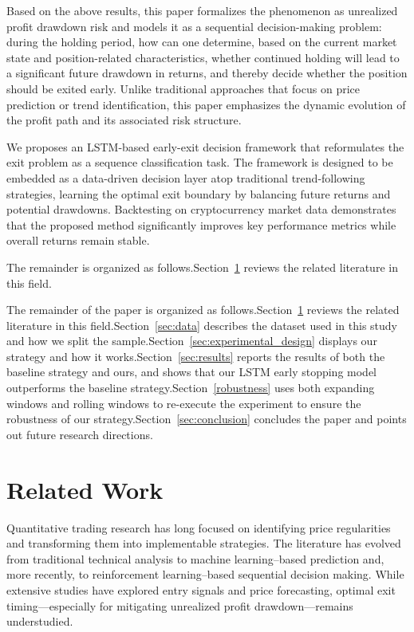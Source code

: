 \documentclass[12pt]{article}
\begin{document}
Based on the above results, this paper formalizes the phenomenon as unrealized profit drawdown risk and models it as a sequential decision-making problem: during the holding period, how can one determine, based on the current market state and position-related characteristics, whether continued holding will lead to a significant future drawdown in returns, and thereby decide whether the position should be exited early. Unlike traditional approaches that focus on price prediction or trend identification, this paper emphasizes the dynamic evolution of the profit path and its associated risk structure.

We proposes an LSTM-based early-exit decision framework that reformulates the exit problem as a sequence classification task. The framework is designed to be embedded as a data-driven decision layer atop traditional trend-following strategies, learning the optimal exit boundary by balancing future returns and potential drawdowns. Backtesting on cryptocurrency market data demonstrates that the proposed method significantly improves key performance metrics while overall returns remain stable.

The remainder is organized as follows.Section~\ref{sec:relatedWork} reviews the related literature in this field.


The remainder of the paper is organized as follows.Section~\ref{sec:relatedWork} reviews the related literature in this field.Section~\ref{sec:data} describes the dataset used in this study and how we split the sample.Section~\ref{sec:experimental_design} displays our strategy and how it works.Section~\ref{sec:results} reports the results of both the baseline strategy and ours, and shows that our LSTM early stopping model outperforms the baseline strategy.Section~\ref{robustness} uses both expanding windows and rolling windows to re-execute the experiment to ensure the robustness of our strategy.Section~\ref{sec:conclusion} concludes the paper and points out future research directions.

\section{Related Work}\label{sec:relatedWork}

Quantitative trading research has long focused on identifying price regularities and transforming them into implementable strategies. The literature has evolved from traditional technical analysis to machine learning–based prediction and, more recently, to reinforcement learning–based sequential decision making. While extensive studies have explored entry signals and price forecasting, optimal exit timing—especially for mitigating unrealized profit drawdown—remains understudied.
\end{document}
